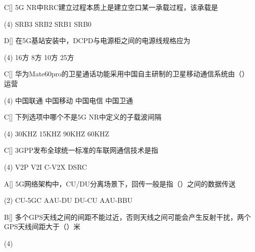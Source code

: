 \begin{choice}{C}[]
    5G NR中RRC建立过程本质上是建立空口某一承载过程，该承载是
    \begin{tasks}(4)
        \task SRB3
        \task SRB2
        \task SRB1
        \task SRB0
    \end{tasks}
\end{choice}


\begin{choice}{D}[]
    在5G基站安装中，DCPD与电源柜之间的电源线规格应为
    \begin{tasks}(4)
        \task 16方
        \task 8方
        \task 10方
        \task 25方
    \end{tasks}
\end{choice}


\begin{choice}{C}[]
    华为Mate60pro的卫星通话功能采用中国自主研制的卫星移动通信系统由（\quad）运营
    \begin{tasks}(4)
        \task 中国联通
        \task 中国移动
        \task 中国电信
        \task 中国卫通
    \end{tasks}
\end{choice}


\begin{choice}{C}[]
    下列选项中哪个不是5G NR中定义的子载波间隔
    \begin{tasks}(4)
        \task 30KHZ
        \task 15KHZ
        \task 90KHZ
        \task 60KHZ
    \end{tasks}
\end{choice}

\begin{choice}{C}[]
    3GPP发布全球统一标准的车联网通信技术是指
    \begin{tasks}(4)
        \task V2P
        \task V2I
        \task C-V2X
        \task DSRC
    \end{tasks}
\end{choice}

\begin{choice}{A}[]
    5G网络架构中，CU/DU分离场景下，回传一般是指（\quad）之间的数据传送
    \begin{tasks}(2)
        \task CU-5GC
        \task AAU-DU
        \task DU-CU
        \task AAU-BBU
    \end{tasks}
\end{choice}



\begin{choice}{B}[]
    多个GPS天线之间的间距不能过近，否则天线之间可能会产生反射干扰，两个GPS天线间距大于（\quad）米
    \begin{tasks}(4)
    \end{tasks}
\end{choice}

